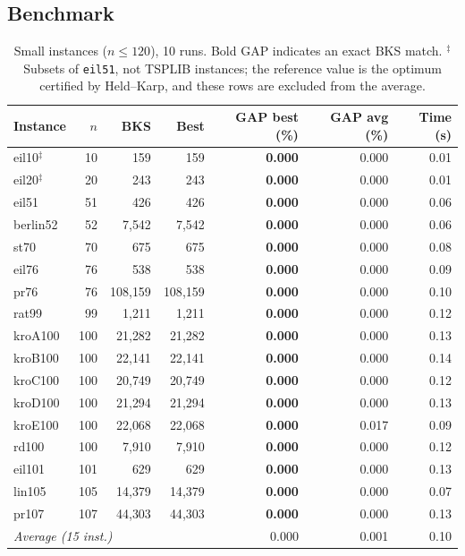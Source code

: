 \documentclass[runningheads]{llncs}
\begin{document}
\subsection{Benchmark}

\begin{table}
\caption{Small instances ($n\le 120$), 10 runs. Bold GAP indicates an
exact BKS match. $^{\ddagger}$Subsets of \texttt{eil51}, not TSPLIB
instances; the reference value is the optimum certified by Held--Karp,
and these rows are excluded from the average.}
\label{tab:small}
\centering\scriptsize
\begin{tabular}{@{}lrrrrrr@{}}
\toprule
\textbf{Instance} & $n$ & \textbf{BKS} & \textbf{Best} & \textbf{GAP best (\%)} & \textbf{GAP avg (\%)} & \textbf{Time (s)}\\
\midrule
eil10$^{\ddagger}$ & 10 & 159 & 159 & \textbf{0.000} & 0.000 & 0.01 \\
eil20$^{\ddagger}$ & 20 & 243 & 243 & \textbf{0.000} & 0.000 & 0.01 \\
eil51 & 51 & 426 & 426 & \textbf{0.000} & 0.000 & 0.06 \\
berlin52 & 52 & 7{,}542 & 7{,}542 & \textbf{0.000} & 0.000 & 0.06 \\
st70 & 70 & 675 & 675 & \textbf{0.000} & 0.000 & 0.08 \\
eil76 & 76 & 538 & 538 & \textbf{0.000} & 0.000 & 0.09 \\
pr76 & 76 & 108{,}159 & 108{,}159 & \textbf{0.000} & 0.000 & 0.10 \\
rat99 & 99 & 1{,}211 & 1{,}211 & \textbf{0.000} & 0.000 & 0.12 \\
kroA100 & 100 & 21{,}282 & 21{,}282 & \textbf{0.000} & 0.000 & 0.13 \\
kroB100 & 100 & 22{,}141 & 22{,}141 & \textbf{0.000} & 0.000 & 0.14 \\
kroC100 & 100 & 20{,}749 & 20{,}749 & \textbf{0.000} & 0.000 & 0.12 \\
kroD100 & 100 & 21{,}294 & 21{,}294 & \textbf{0.000} & 0.000 & 0.13 \\
kroE100 & 100 & 22{,}068 & 22{,}068 & \textbf{0.000} & 0.017 & 0.09 \\
rd100 & 100 & 7{,}910 & 7{,}910 & \textbf{0.000} & 0.000 & 0.12 \\
eil101 & 101 & 629 & 629 & \textbf{0.000} & 0.000 & 0.13 \\
lin105 & 105 & 14{,}379 & 14{,}379 & \textbf{0.000} & 0.000 & 0.07 \\
pr107 & 107 & 44{,}303 & 44{,}303 & \textbf{0.000} & 0.000 & 0.13 \\
\midrule
\multicolumn{4}{l}{\textit{Average (15 inst.)}} & 0.000 & 0.001 & 0.10 \\
\bottomrule
\end{tabular}
\end{table}
\end{document}
